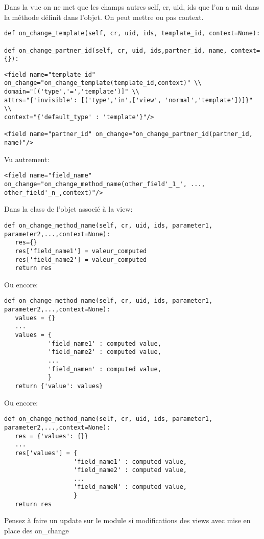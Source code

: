 \documentclass[12pt,a4paper]{article}
\begin{document}
Dans la vue on ne met que les champs autres self, cr, uid, ids que l'on a mit dans la méthode définit dans l'objet. On peut mettre ou pas context.

\begin{verbatim}
def on_change_template(self, cr, uid, ids, template_id, context=None):

def on_change_partner_id(self, cr, uid, ids,partner_id, name, context={}):  
\end{verbatim}

\begin{verbatim}
<field name="template_id" on_change="on_change_template(template_id,context)" \\
domain="[('type','=','template')]" \\
attrs="{'invisible': [('type','in',['view', 'normal','template'])]}" \\
context="{'default_type' : 'template'}"/> 

<field name="partner_id" on_change="on_change_partner_id(partner_id, name)"/> 
\end{verbatim}

Vu autrement:

\begin{verbatim}
<field name="field_name" on_change="on_change_method_name(other_field'_1_', ..., other_field'_n_,context)"/>
\end{verbatim}

Dans la class de l'objet associé à la view:
\begin{verbatim}
def on_change_method_name(self, cr, uid, ids, parameter1, parameter2,...,context=None):
   res={}
   res['field_name1'] = valeur_computed
   res['field_name2'] = valeur_computed
   return res
\end{verbatim}


Ou encore:
\begin{verbatim}
def on_change_method_name(self, cr, uid, ids, parameter1, parameter2,...,context=None):
   values = {}
   ...
   values = {
            'field_name1' : computed value,
            'field_name2' : computed value,
            ...
            'field_namen' : computed value,
            }
   return {'value': values}
\end{verbatim}

Ou encore:
\begin{verbatim}
def on_change_method_name(self, cr, uid, ids, parameter1, parameter2,...,context=None):
   res = {'values': {}}
   ...
   res['values'] = {
                   'field_name1' : computed value,
                   'field_name2' : computed value,
                   ...
                   'field_nameN' : computed value,
                   }
   return res
\end{verbatim}
Pensez à faire un update sur le module si modifications des views avec mise en place des on\_change
\end{document}
